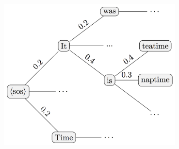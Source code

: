 \documentclass[10pt]{beamer}
\begin{document}
\begin{frame}
\begin{columns}
\begin{column}{0.5\textwidth}
\begin{center}
            \includegraphics[width=0.7\textwidth]{images/beam_search.png}
        \end{center}
    \end{column}
\end{columns}

\end{frame}
\end{document}
